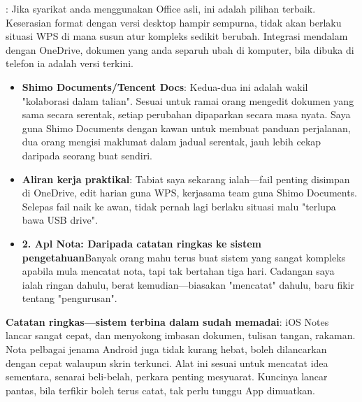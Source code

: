 


: Jika syarikat anda menggunakan Office asli, ini adalah pilihan terbaik. Keserasian format dengan versi desktop hampir sempurna, tidak akan berlaku situasi WPS di mana susun atur kompleks sedikit berubah. Integrasi mendalam dengan OneDrive, dokumen yang anda separuh ubah di komputer, bila dibuka di telefon ia adalah versi terkini.

\begin{itemize}
  \item \textbf{Shimo Documents/Tencent Docs}: Kedua-dua ini adalah wakil "kolaborasi dalam talian". Sesuai untuk ramai orang mengedit dokumen yang sama secara serentak, setiap perubahan dipaparkan secara masa nyata. Saya guna Shimo Documents dengan kawan untuk membuat panduan perjalanan, dua orang mengisi maklumat dalam jadual serentak, jauh lebih cekap daripada seorang buat sendiri.
  \item \textbf{Aliran kerja praktikal}: Tabiat saya sekarang ialah—fail penting disimpan di OneDrive, edit harian guna WPS, kerjasama team guna Shimo Documents. Selepas fail naik ke awan, tidak pernah lagi berlaku situasi malu "terlupa bawa USB drive".
  \item \textbf{2. Apl Nota: Daripada catatan ringkas ke sistem pengetahuan}Banyak orang mahu terus buat sistem yang sangat kompleks apabila mula mencatat nota, tapi tak bertahan tiga hari. Cadangan saya ialah ringan dahulu, berat kemudian—biasakan "mencatat" dahulu, baru fikir tentang "pengurusan".
\end{itemize}

\textbf{Catatan ringkas—sistem terbina dalam sudah memadai}: iOS Notes lancar sangat cepat, dan menyokong imbasan dokumen, tulisan tangan, rakaman. Nota pelbagai jenama Android juga tidak kurang hebat, boleh dilancarkan dengan cepat walaupun skrin terkunci. Alat ini sesuai untuk mencatat idea sementara, senarai beli-belah, perkara penting mesyuarat. Kuncinya lancar pantas, bila terfikir boleh terus catat, tak perlu tunggu App dimuatkan.

